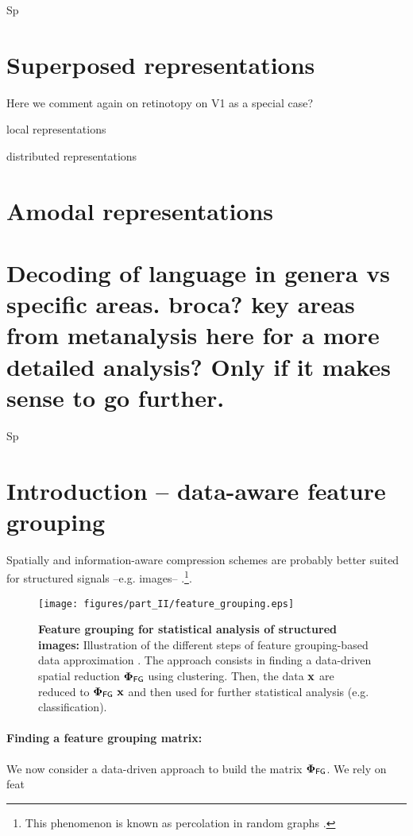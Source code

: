 Sp

\section{Superposed representations}


Here we comment again on retinotopy on V1 as a special case?

local representations

distributed representations




\section{Amodal representations}


\section{Decoding of language in genera vs specific areas. broca? key areas from metanalysis here for a more detailed analysis? Only if it makes sense to go further.}
%
Sp



\section{Introduction -- data-aware feature grouping}
%
Spatially and information-aware compression schemes are probably better suited 
for structured signals --e.g. images-- \citep{Achanta2012}.\footnote{This phenomenon is known as percolation 
in random graphs \citep{stauffer1992}.}.


\begin{figure}[hptb]
\centering
\texttt{[image: figures/part\_II/feature\_grouping.eps]} 
\caption{\textbf{Feature grouping for statistical analysis of structured 
images:} Illustration of the different steps of feature grouping-based data 
approximation .
%
The approach consists in finding a data-driven spatial reduction $\mathbf{\Phi}_{\mathsf{FG}}$ using 
clustering. 
%
Then, the data $\mathbf{x}$ are reduced to $\mathbf{\Phi}_{\mathsf{FG}} \ \mathbf{x}$ and then used for further 
statistical analysis (e.g. classification). 
}
\label{fig:feature_grouping}
\end{figure}

\paragraph{Finding a feature grouping matrix:}
We now consider a data-driven approach to build the matrix $\mathbf{\Phi}_{\mathsf{FG}}$.
%
We rely on feat


